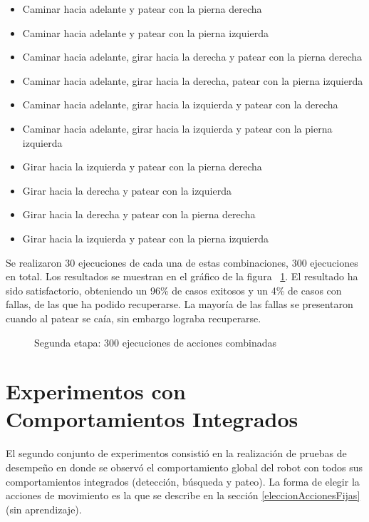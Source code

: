 \begin{itemize}
\setlength{\itemsep}{1pt}
\item Caminar hacia adelante y patear con la pierna derecha 
\item Caminar hacia adelante y patear con la pierna izquierda
\item Caminar hacia adelante, girar hacia la derecha y patear con la pierna derecha
\item Caminar hacia adelante, girar hacia la derecha, patear con la pierna izquierda 
\item Caminar hacia adelante, girar hacia la izquierda y patear con la derecha
\item Caminar hacia adelante, girar hacia la  izquierda y  patear con la pierna izquierda
\item Girar hacia la izquierda y patear con la pierna derecha
\item Girar hacia la derecha y patear con la izquierda
\item Girar hacia la derecha y patear con la pierna derecha
\item Girar hacia la izquierda y patear con la pierna izquierda
 \end{itemize}

Se realizaron 30 ejecuciones de cada una de estas combinaciones, 300 ejecuciones en total. Los resultados se muestran en el gráfico de la figura ~\ref{fig:etp2}. El resultado ha sido satisfactorio, obteniendo un 96\% de casos exitosos y un 4\% de casos con fallas, de las que ha podido recuperarse. La mayoría de las fallas se presentaron cuando al patear se caía, sin embargo lograba recuperarse.  

\begin{figure}[th!]
\caption{Segunda etapa: 300 ejecuciones de acciones combinadas}
\label{fig:etp2}
\end{figure}

\section{Experimentos con Comportamientos Integrados}
\label{sec:experimentosintegrados}

El segundo conjunto de experimentos consistió en la realización de pruebas de desempeño en donde se observó el comportamiento global del robot con todos sus comportamientos integrados (detección, búsqueda y pateo). La forma de elegir la acciones de movimiento es la que se describe en la sección \ref{eleccionAccionesFijas} (sin aprendizaje). 

